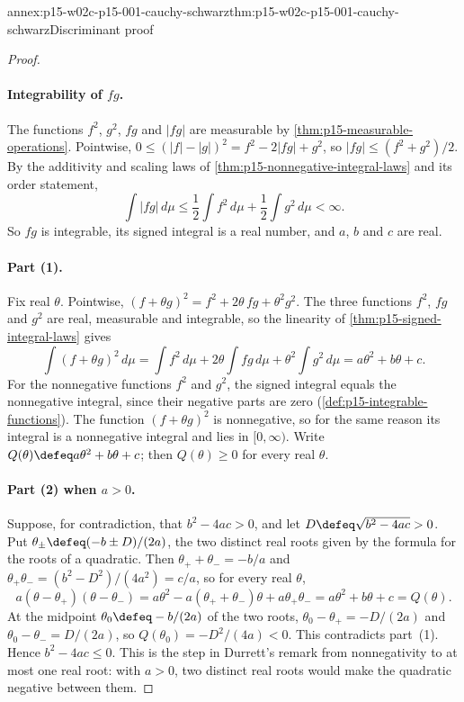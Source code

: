 \begin{annexitem}{annex:p15-w02c-p15-001-cauchy-schwarz}{thm:p15-w02c-p15-001-cauchy-schwarz}{Discriminant proof}
\begin{proof}
\paragraph{Integrability of \(fg\).}
The functions \(f^2\), \(g^2\), \(fg\) and \(|fg|\) are measurable by
\cref{thm:p15-measurable-operations}. Pointwise,
\(0\leq(|f|-|g|)^2=f^2-2|fg|+g^2\), so \(|fg|\leq(f^2+g^2)/2\). By the
additivity and scaling laws of \cref{thm:p15-nonnegative-integral-laws}
and its order statement,
\[
 \int|fg|\,d\mu\leq\frac12\int f^2\,d\mu+\frac12\int g^2\,d\mu<\infty .
\]
So \(fg\) is integrable, its signed integral is a real number, and
\(a\), \(b\) and \(c\) are real.

\paragraph{Part (1).}
Fix real \(\theta\). Pointwise,
\((f+\theta g)^2=f^2+2\theta\,fg+\theta^2g^2\). The three functions
\(f^2\), \(fg\) and \(g^2\) are real, measurable and integrable, so
the linearity of \cref{thm:p15-signed-integral-laws} gives
\[
 \int(f+\theta g)^2\,d\mu
 =\int f^2\,d\mu+2\theta\int fg\,d\mu+\theta^2\int g^2\,d\mu
 =a\theta^2+b\theta+c .
\]
For the nonnegative functions \(f^2\) and \(g^2\), the signed integral
equals the nonnegative integral, since their negative parts are zero
(\cref{def:p15-integrable-functions}). The function
\((f+\theta g)^2\) is nonnegative, so for the same reason its integral is a
nonnegative integral and lies in \([0,\infty)\). Write
\(Q(\theta)\defeq a\theta^2+b\theta+c\); then \(Q(\theta)\geq0\) for every
real \(\theta\).

\paragraph{Part (2) when \(a>0\).}
Suppose, for contradiction, that \(b^2-4ac>0\), and let
\(D\defeq\sqrt{b^2-4ac}>0\). Put
\(\theta_\pm\defeq(-b\pm D)/(2a)\), the two distinct real roots given
by the formula for the roots of a quadratic. Then
\(\theta_++\theta_-=-b/a\) and
\(\theta_+\theta_-=(b^2-D^2)/(4a^2)=c/a\), so for every real \(\theta\),
\[
 a(\theta-\theta_+)(\theta-\theta_-)
 =a\theta^2-a(\theta_++\theta_-)\theta+a\theta_+\theta_-
 =a\theta^2+b\theta+c=Q(\theta).
\]
At the midpoint \(\theta_0\defeq-b/(2a)\) of the two roots,
\(\theta_0-\theta_+=-D/(2a)\) and \(\theta_0-\theta_-=D/(2a)\), so
\(Q(\theta_0)=-D^2/(4a)<0\). This contradicts part~(1). Hence
\(b^2-4ac\leq0\). This is the step in Durrett's remark from nonnegativity to at most one
real root: with \(a>0\), two distinct real roots would make the
quadratic negative between them.


\end{proof}
\end{annexitem}
